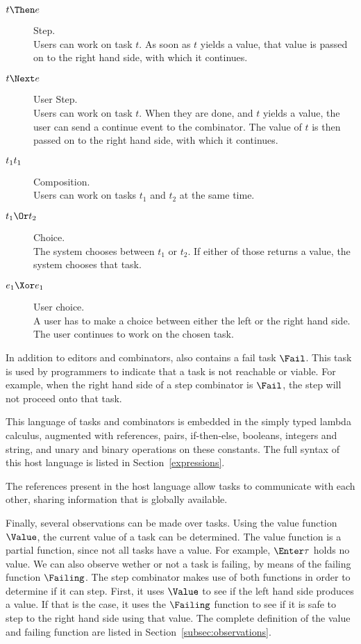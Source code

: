 \begin{description}
  \item[$t \Then e$] Step.\\
  Users can work on task $t$.
  As soon as $t$ yields a value, that value is passed on to the right hand side, with which it continues.
  \item[$t \Next e$] User Step.\\
  Users can work on task $t$.
  When they are done, and $t$ yields a value, the user can send a continue event to the combinator.
  The value of $t$ is then passed on to the right hand side, with which it continues.
  \item[$t_1 \relax t_1$] Composition.\\
  Users can work on tasks $t_1$ and $t_2$ at the same time.
  \item[$t_1 \Or t_2$] Choice.\\
  The system chooses between $t_1$ or $t_2$. If either of those returns a value, the system chooses that task.
  \item[$e_1 \Xor e_1$] User choice.\\
  A user has to make a choice between either the left or the right hand side.
  The user continues to work on the chosen task.
\end{description}

In addition to editors and combinators, \TOPHAT also contains a fail task $\Fail$.
This task is used by programmers to indicate that a task is not reachable or viable.
For example, when the right hand side of a step combinator is $\Fail$, the step will not proceed onto that task.

This language of tasks and combinators is embedded in the simply typed lambda calculus, augmented with references, pairs, if-then-else, booleans, integers and string, and unary and binary operations on these constants.
The full syntax of this host language is listed in Section~\ref{expressions}.

The references present in the host language allow tasks to communicate with each other,
sharing information that is globally available.

Finally, several observations can be made over tasks.
Using the value function $\Value$, the current value of a task can be determined.
The value function is a partial function, since not all tasks have a value.
For example, $\Enter \tau$ holds no value.
We can also observe wether or not a task is failing, by means of the failing function $\Failing$.
The step combinator makes use of both functions in order to determine if it can step.
First, it uses $\Value$ to see if the left hand side produces a value.
If that is the case, it uses the $\Failing$ function to see if it is safe to step to the right hand side using that value.
The complete definition of the value and failing function are listed in Section~\ref{subsec:observations}.


